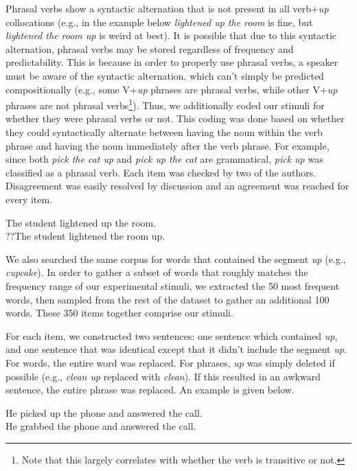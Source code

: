 \documentclass[
  authoryear,
  preprint,
  1p,
  onecolumn]{elsarticle}
\begin{document}
Phrasal verbs show a syntactic alternation that is not present in all
verb+\emph{up} collocations (e.g., in the example below \emph{lightened
up the room} is fine, but \emph{lightened the room up} is weird at
best). It is possible that due to this syntactic alternation, phrasal
verbs may be stored regardless of frequency and predictability. This is
because in order to properly use phrasal verbs, a speaker must be aware
of the syntactic alternation, which can't simply be predicted
compositionally (e.g., some V+\emph{up} phrases are phrasal verbs, while
other V+\emph{up} phrases are not phrasal verbs\footnote{Note that this
  largely correlates with whether the verb is transitive or not.}).
Thus, we additionally coded our stimuli for whether they were phrasal
verbs or not. This coding was done based on whether they could
syntactically alternate between having the noun within the verb phrase
and having the noun immediately after the verb phrase. For example,
since both \emph{pick the cat up} and \emph{pick up the cat} are
grammatical, \emph{pick up} was classified as a phrasal verb. Each item
was checked by two of the authors. Disagreement was easily resolved by
discussion and an agreement was reached for every item.

\begin{exe} 
\ex
  \begin{xlist}
    \ex The student lightened up the room. \\
    \ex ??The student lightened the room up. \\
  \end{xlist}
\end{exe}

We also searched the same corpus for words that contained the segment
\emph{up} (e.g., \emph{cupcake}). In order to gather a subset of words
that roughly matches the frequency range of our experimental stimuli, we
extracted the 50 most frequent words, then sampled from the rest of the
dataset to gather an additional 100 words. These 350 items together
comprise our stimuli.

For each item, we constructed two sentences: one sentence which
contained \emph{up}, and one sentence that was identical except that it
didn't include the segment \emph{up.} For words, the entire word was
replaced. For phrases, \emph{up} was simply deleted if possible (e.g.,
\emph{clean up} replaced with \emph{clean}). If this resulted in an
awkward sentence, the entire phrase was replaced. An example is given
below.

\begin{exe} 
\ex
  \begin{xlist}
    \ex He picked up the phone and answered the call. \\
    \ex He grabbed the phone and answered the call. \\
  \end{xlist}
\end{exe}
\end{document}

